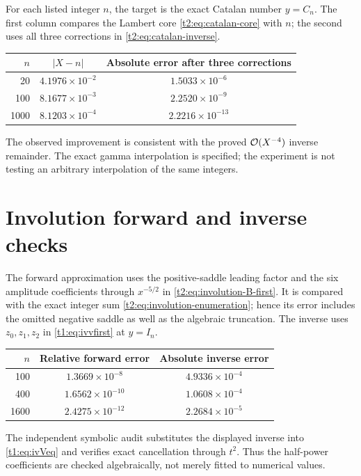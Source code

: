 \documentclass[11pt,openany]{book}
\numberwithin{equation}{chapter}
\theoremstyle{plain}
\theoremstyle{definition}
\theoremstyle{remark}
\begin{document}
For each listed integer $n$, the target is the exact Catalan number $y=C_n$. The first column compares the Lambert core \eqref{t2:eq:catalan-core} with $n$; the second uses all three corrections in \eqref{t2:eq:catalan-inverse}.
\begin{center}
\begin{tabular}{rcc}
\toprule
$n$ & $|X-n|$ & Absolute error after three corrections\\\midrule
20 & $4.1976\times10^{-2}$ & $1.5033\times10^{-6}$\\
100 & $8.1677\times10^{-3}$ & $2.2520\times10^{-9}$\\
1000 & $8.1203\times10^{-4}$ & $2.2216\times10^{-13}$\\\bottomrule
\end{tabular}
\end{center}
The observed improvement is consistent with the proved $\mathcal O(X^{-4})$ inverse remainder. The exact gamma interpolation is specified; the experiment is not testing an arbitrary interpolation of the same integers.

\section{Involution forward and inverse checks}

The forward approximation uses the positive-saddle leading factor and the six amplitude coefficients through $x^{-5/2}$ in \eqref{t2:eq:involution-B-first}. It is compared with the exact integer sum \eqref{t2:eq:involution-enumeration}; hence its error includes the omitted negative saddle as well as the algebraic truncation. The inverse uses $z_0,z_1,z_2$ in \eqref{t1:eq:ivvfirst} at $y=I_n$.
\begin{center}
\begin{tabular}{rcc}
\toprule
$n$ & Relative forward error & Absolute inverse error\\\midrule
100 & $1.3669\times10^{-8}$ & $4.9336\times10^{-4}$\\
400 & $1.6562\times10^{-10}$ & $1.0608\times10^{-4}$\\
1600 & $2.4275\times10^{-12}$ & $2.2684\times10^{-5}$\\\bottomrule
\end{tabular}
\end{center}
The independent symbolic audit substitutes the displayed inverse into \eqref{t1:eq:ivVeq} and verifies exact cancellation through $t^2$. Thus the half-power coefficients are checked algebraically, not merely fitted to numerical values.
\end{document}
